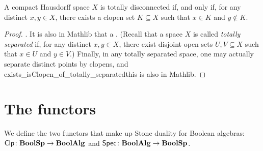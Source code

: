 \begin{lemma}\label{BoolSpchar}
    A compact Hausdorff space $X$ is totally disconnected if, and only if, for
    any distinct $x, y \in X$, there exists a clopen set $K \subseteq X$ such
    that $x \in K$ and $y \not\in K$.
\end{lemma}
\begin{proof}
   . It is also in Mathlib that a
   . (Recall that a
   space $X$ is called \emph{totally separated} if, for any distinct $x,y \in
   X$, there exist disjoint open sets $U, V \subseteq X$ such that $x \in U$
   and $y \in V$.) Finally, in any totally separated space, one may actually
   separate distinct points by clopens, and
   {exists_isClopen_of_totally_separated}{this is also in Mathlib}.
\end{proof}
\chapter{The functors}
We define the two functors that make up Stone duality for Boolean algebras:
$\operatorname*{\mathsf{Clp}} \colon \mathbf{BoolSp} \to \mathbf{BoolAlg}$ and $\operatorname*{\mathsf{Spec}} \colon \mathbf{BoolAlg} \to \mathbf{BoolSp}$.


